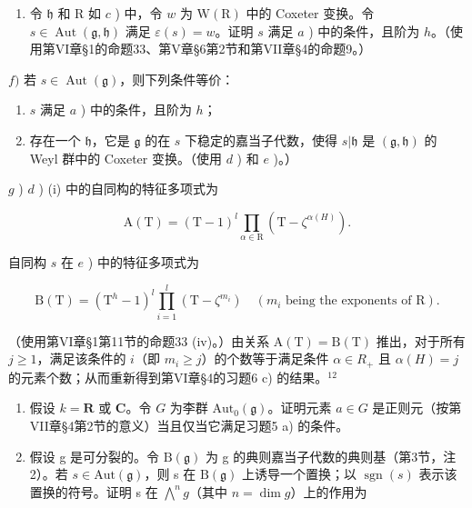\begin{enumerate}
\def\labelenumi{\alph{enumi})}
\setcounter{enumi}{4}
\tightlist
\item
  令 \(\mathfrak{h}\) 和 \(\mathrm{R}\) 如 \(c\) ) 中，令 \(w\) 为 \(\mathrm{W(R)}\) 中的 Coxeter 变换。令 \(s \in \operatorname{Aut}(\mathfrak{g}, \mathfrak{h})\) 满足 \(\varepsilon(s) = w\)。证明 \(s\) 满足 \(a\) ) 中的条件，且阶为 \(h\)。（使用第VI章§1的命题33、第V章§6第2节和第VII章§4的命题9。）
\end{enumerate}

\(f)\) 若 \(s \in \operatorname{Aut}(\mathfrak{g})\)，则下列条件等价：

\begin{enumerate}
\def\labelenumi{(\roman{enumi})}
\item
  \(s\) 满足 \(a\) ) 中的条件，且阶为 \(h\)；
\item
  存在一个 \(\mathfrak{h}\)，它是 \(\mathfrak{g}\) 的在 \(s\) 下稳定的嘉当子代数，使得 \(s|\mathfrak{h}\) 是 \((\mathfrak{g},\mathfrak{h})\) 的 Weyl 群中的 Coxeter 变换。（使用 \(d\) ) 和 \(e\) )。）
\end{enumerate}

\(g\) ) \(d\) ) (i) 中的自同构的特征多项式为

\[
\mathrm{A} (\mathrm{T}) = (\mathrm{T} - 1) ^ {l} \prod_ {\alpha \in \mathrm{R}} (\mathrm{T} - \zeta^ {\alpha (H)}).
\]

自同构 \(s\) 在 \(e\) ) 中的特征多项式为

\[
\mathrm{B} (\mathrm{T}) = \left(\mathrm{T} ^ {h} - 1\right) ^ {l} \prod_ {i = 1} ^ {l} \left(\mathrm{T} - \zeta^ {m _ {i}}\right) \quad \left(m _ {i} \text { being   the   exponents   of } \mathrm{R}\right).
\]

（使用第VI章§1第11节的命题33 (iv)。）由关系 \(\mathrm{A(T)} = \mathrm{B(T)}\) 推出，对于所有 \(j \geq 1\)，满足该条件的 \(i\)（即 \(m_i \geq j\)）的个数等于满足条件 \(\alpha\in R_{+}\) 且 \(\alpha(H)=j\) 的元素个数；从而重新得到第VI章§4的习题6 c) 的结果。\(^{12}\)

\begin{enumerate}
\def\labelenumi{\arabic{enumi})}
\setcounter{enumi}{5}
\item
  假设 \(k = \mathbf{R}\) 或 \(\mathbf{C}\)。令 \(G\) 为李群 \(\mathrm{Aut}_0(\mathfrak{g})\)。证明元素 \(a \in G\) 是正则元（按第VII章§4第2节的意义）当且仅当它满足习题5 a) 的条件。
\item
  假设 g 是可分裂的。令 \(\mathrm{B}(\mathfrak{g})\) 为 g 的典则嘉当子代数的典则基（第3节，注2）。若 \(s \in \mathrm{Aut}(\mathfrak{g})\)，则 s 在 \(\mathrm{B}(\mathfrak{g})\) 上诱导一个置换；以 \(\operatorname{sgn}(s)\) 表示该置换的符号。证明 s 在 \(\bigwedge^{n} g\)（其中 \(n = \dim g\)）上的作用为
\end{enumerate}

